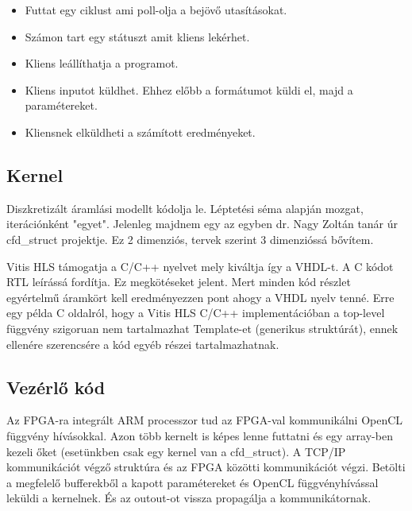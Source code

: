\documentclass{article}
\begin{document}
\begin{itemize}
\item Futtat egy ciklust ami poll-olja a bejövő utasításokat.
\item Számon tart egy státuszt amit kliens lekérhet.
\item Kliens leállíthatja a programot.
\item Kliens inputot küldhet. Ehhez előbb a formátumot küldi el, majd a paramétereket.
\item Kliensnek elküldheti a számított eredményeket.
\end{itemize}

\subsection{Kernel}
\cite{projekt} Diszkretizált áramlási modellt kódolja le. Léptetési séma alapján mozgat, iterációnként "egyet". Jelenleg majdnem egy az egyben dr. Nagy Zoltán tanár úr cfd\_struct projektje. Ez 2 dimenziós, tervek szerint 3 dimenzióssá bővítem. 

\cite{intro} Vitis HLS támogatja a C/C++ nyelvet mely kiváltja így a VHDL-t. A C kódot RTL leírássá fordítja. Ez megkötéseket jelent. Mert minden kód részlet egyértelmű áramkört kell eredményezzen pont ahogy a VHDL nyelv tenné. Erre egy példa C oldalról, hogy a Vitis HLS C/C++ implementációban a top-level függvény szigoruan nem tartalmazhat Template-et (generikus struktúrát), ennek ellenére szerencsére a kód egyéb részei tartalmazhatnak. 

\subsection{Vezérlő kód}
 Az FPGA-ra integrált ARM processzor tud az FPGA-val kommunikálni OpenCL függvény hívásokkal. Azon több kernelt is képes lenne futtatni és egy array-ben kezeli őket (esetünkben csak egy kernel van a cfd\_struct). A TCP/IP kommunikációt végző struktúra és az FPGA közötti kommunikációt végzi. Betölti a megfelelő bufferekből a kapott paramétereket és OpenCL függvényhívással leküldi a kernelnek. És az outout-ot vissza propagálja a kommunikátornak. 
\end{document}
